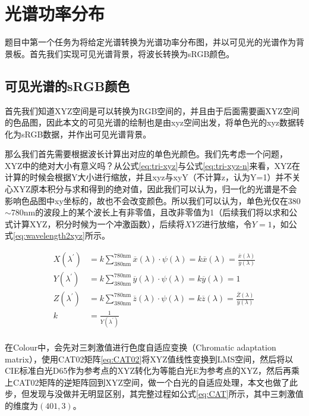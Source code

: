 \section{光谱功率分布}
题目中第一个任务为将给定光谱转换为光谱功率分布图，并以可见光的光谱作为背景板。首先我们实现可见光谱背景，将波长转换为sRGB颜色。

\subsection{可见光谱的sRGB颜色}

首先我们知道XYZ空间是可以转换为RGB空间的，并且由于后面需要画XYZ空间的色品图，因此本文的可见光谱的绘制也是由xyz空间出发，将单色光的xyz数据转化为sRGB数据，并作出可见光谱背景。

那么我们首先需要根据波长计算出对应的单色光颜色。我们先考虑一个问题，XYZ中的绝对大小有意义吗？从公式\eqref{eq:tri-xyz}与公式\eqref{eq:tri-xyz-n}来看，XYZ在计算的时候会根据Y大小进行缩放，并且xyz与xyY（不计算z，认为Y=1）并不关心XYZ原本积分与求和得到的绝对值，因此我们可以认为，归一化的光谱是不会影响色品图中xy坐标的，故也不会改变颜色。所以我们可以认为，单色光仅在380$\sim$780nm的波段上的某个波长上有非零值，且改非零值为1（后续我们将以求和公式计算XYZ，积分时候为一个冲激函数），后续将$XYZ$进行放缩，令$Y=1$，如公式\eqref{eq:wavelength2xyz}所示。

\begin{equation}
    \begin{aligned}
        X(\lambda^\prime) & =k\sum_{380\text{nm}}^{780\text{nm}} \overline{x}(\lambda)\cdot\psi(\lambda) = k \overline{x}(\lambda) = \frac{\overline{x}(\lambda)}{\overline{y}(\lambda)}\\
        Y(\lambda^\prime) & =k\sum_{380\text{nm}}^{780\text{nm}} \overline{y}(\lambda)\cdot\psi(\lambda) = k \overline{y}(\lambda) = 1\\
        Z(\lambda^\prime) & =k\sum_{380\text{nm}}^{780\text{nm}} \overline{z}(\lambda)\cdot\psi(\lambda) = k \overline{z}(\lambda) = \frac{\overline{Z}(\lambda)}{\overline{y}(\lambda)}\\
        k & = \frac{1}{Y(\lambda^\prime)}\\
    \end{aligned}
    \label{eq:wavelength2xyz}
\end{equation}

在Colour中，会先对三刺激值进行色度自适应变换（Chromatic adaptation matrix），使用CAT02矩阵\eqref{eq:CAT02}将XYZ值线性变换到LMS空间，然后将以CIE标准白光D65作为参考点的XYZ转化为等能白光E为参考点的XYZ，然后再乘上CAT02矩阵的逆矩阵回到XYZ空间，做一个白光的自适应处理，本文也做了此步，但发现与没做并无明显区别，其完整过程如公式\eqref{eq:CAT}所示，其中三刺激值的维度为$(401,3)$。

